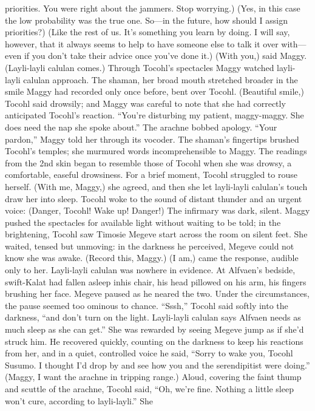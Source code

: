 \documentclass[9pt]{article}
\begin{document}
priorities. You were right about the jammers. Stop worrying.)
(Yes, in this case the low probability was the true one. So—in the future, how should I assign
priorities?)
(Like the rest of us. It’s something you learn by doing. I will say, however, that it always seems to
help to have someone else to talk it over with—even if you don’t take their advice once you’ve done it.)
(With you,) said Maggy. (Layli-layli calulan comes.) Through Tocohl’s spectacles Maggy watched
layli-layli calulan approach. The shaman, her broad mouth stretched broader in the smile Maggy had
recorded only once before, bent over Tocohl. (Beautiful smile,) Tocohl said drowsily; and Maggy was
careful to note that she had correctly anticipated Tocohl’s reaction. “You’re disturbing my patient,
maggy-maggy. She does need the nap she spoke about.”
The arachne bobbed apology. “Your pardon,” Maggy told her through its vocoder.
The shaman’s fingertips brushed Tocohl’s temples; she murmured words incomprehensible to
Maggy. The readings from the 2nd skin began to resemble those of Tocohl when she was drowsy, a
comfortable, easeful drowsiness.
For a brief moment, Tocohl struggled to rouse herself. (With me, Maggy,) she agreed, and then she
let layli-layli calulan’s touch draw her into sleep.
Tocohl woke to the sound of distant thunder and an urgent voice: (Danger, Tocohl! Wake up!
Danger!)
The infirmary was dark, silent. Maggy pushed the spectacles for available light without waiting to be
told; in the brightening, Tocohl saw Timosie Megeve start across the room on silent feet.
She waited, tensed but unmoving: in the darkness he perceived, Megeve could not know she was
awake. (Record this, Maggy.)
(I am,) came the response, audible only to her.
Layli-layli calulan was nowhere in evidence. At Alfvaen’s bedside, swift-Kalat had fallen asleep inhis chair, his head pillowed on his arm, his fingers brushing her face.
Megeve paused as he neared the two.
Under the circumstances, the pause seemed too ominous to chance. “Sssh,” Tocohl said softly into
the darkness, “and don’t turn on the light. Layli-layli calulan says Alfvaen needs as much sleep as she
can get.” She was rewarded by seeing Megeve jump as if she’d struck him.
He recovered quickly, counting on the darkness to keep his reactions from her, and in a quiet,
controlled voice he said, “Sorry to wake you, Tocohl Susumo. I thought I’d drop by and see how you
and the serendipitist were doing.”
(Maggy, I want the arachne in tripping range.) Aloud, covering the faint thump and scuttle of the
arachne, Tocohl said, “Oh, we’re fine. Nothing a little sleep won’t cure, according to layli-layli.” She
\end{document}
